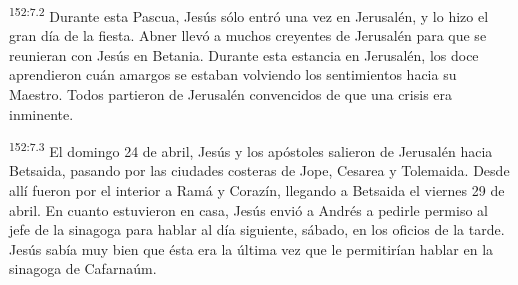 \par 
\textsuperscript{152:7.2} Durante esta Pascua, Jesús sólo entró una vez en Jerusalén, y lo hizo el gran día de la fiesta. Abner llevó a muchos creyentes de Jerusalén para que se reunieran con Jesús en Betania. Durante esta estancia en Jerusalén, los doce aprendieron cuán amargos se estaban volviendo los sentimientos hacia su Maestro. Todos partieron de Jerusalén convencidos de que una crisis era inminente.

\par 
\textsuperscript{152:7.3} El domingo 24 de abril, Jesús y los apóstoles salieron de Jerusalén hacia Betsaida, pasando por las ciudades costeras de Jope, Cesarea y Tolemaida. Desde allí fueron por el interior a Ramá y Corazín, llegando a Betsaida el viernes 29 de abril. En cuanto estuvieron en casa, Jesús envió a Andrés a pedirle permiso al jefe de la sinagoga para hablar al día siguiente, sábado, en los oficios de la tarde. Jesús sabía muy bien que ésta era la última vez que le permitirían hablar en la sinagoga de Cafarnaúm.